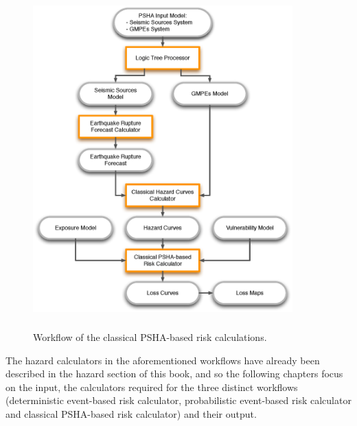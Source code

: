 \begin{figure}[ht]
\centering
\includegraphics[width=10cm,height=13cm]{./Figures/Part_Risk/Scheme_PSHA_calc.eps}
\caption{Workflow of the classical PSHA-based risk calculations.}
\label{fig:Scheme_classrisk_calc}
\end{figure}

The hazard calculators in the aforementioned workflows have already been described in the hazard section of this book, and so the following chapters focus on the input, the calculators required for the three distinct workflows (deterministic event-based risk calculator, probabilistic event-based risk calculator and classical PSHA-based risk calculator) and their output.
%